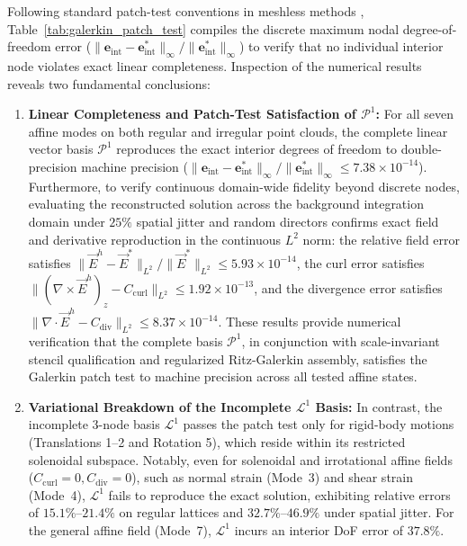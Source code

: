 \documentclass[preprint,12pt]{elsarticle}
\begin{document}
Following standard patch-test conventions in meshless methods \cite{belytschko1994element,liu2009mesh}, Table~\ref{tab:galerkin_patch_test} compiles the discrete maximum nodal degree-of-freedom error ($\|\mathbf{e}_{\mathrm{int}} - \mathbf{e}_{\mathrm{int}}^*\|_\infty / \|\mathbf{e}_{\mathrm{int}}^*\|_\infty$) to verify that no individual interior node violates exact linear completeness. Inspection of the numerical results reveals two fundamental conclusions:
\begin{enumerate}
    \item \textbf{Linear Completeness and Patch-Test Satisfaction of $\mathcal{P}^1$:} For all seven affine modes on both regular and irregular point clouds, the complete linear vector basis $\mathcal{P}^1$ reproduces the exact interior degrees of freedom to double-precision machine precision ($\|\mathbf{e}_{\mathrm{int}} - \mathbf{e}_{\mathrm{int}}^*\|_\infty / \|\mathbf{e}_{\mathrm{int}}^*\|_\infty \le 7.38 \times 10^{-14}$). Furthermore, to verify continuous domain-wide fidelity beyond discrete nodes, evaluating the reconstructed solution across the background integration domain under $25\%$ spatial jitter and random directors confirms exact field and derivative reproduction in the continuous $L^2$ norm: the relative field error satisfies $\|\vec{E}^h - \vec{E}^*\|_{L^2} / \|\vec{E}^*\|_{L^2} \le 5.93 \times 10^{-14}$, the curl error satisfies $\|(\nabla \times \vec{E}^h)_z - C_{\mathrm{curl}}\|_{L^2} \le 1.92 \times 10^{-13}$, and the divergence error satisfies $\|\nabla \cdot \vec{E}^h - C_{\mathrm{div}}\|_{L^2} \le 8.37 \times 10^{-14}$. These results provide numerical verification that the complete basis $\mathcal{P}^1$, in conjunction with scale-invariant stencil qualification and regularized Ritz-Galerkin assembly, satisfies the Galerkin patch test to machine precision across all tested affine states.
    \item \textbf{Variational Breakdown of the Incomplete $\mathcal{L}^1$ Basis:} In contrast, the incomplete 3-node basis $\mathcal{L}^1$ passes the patch test only for rigid-body motions (Translations 1--2 and Rotation 5), which reside within its restricted solenoidal subspace. Notably, even for solenoidal and irrotational affine fields ($C_{\mathrm{curl}} = 0, C_{\mathrm{div}} = 0$), such as normal strain (Mode~3) and shear strain (Mode~4), $\mathcal{L}^1$ fails to reproduce the exact solution, exhibiting relative errors of $15.1\%\text{--}21.4\%$ on regular lattices and $32.7\%\text{--}46.9\%$ under spatial jitter. For the general affine field (Mode~7), $\mathcal{L}^1$ incurs an interior DoF error of $37.8\%$.
\end{enumerate}
\end{document}
